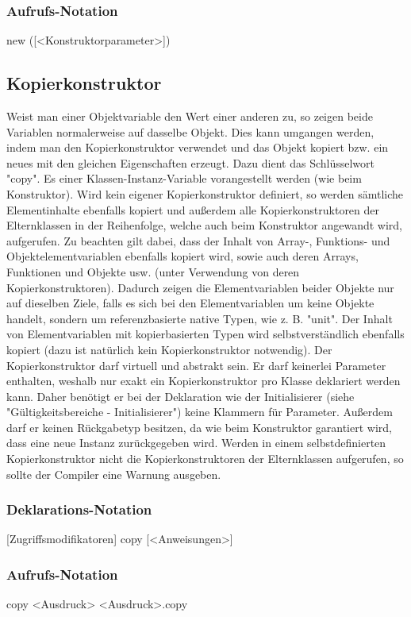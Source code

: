 \subsubsection{Aufrufs-Notation}
new ([<Konstruktorparameter>])

\subsection{Kopierkonstruktor}
Weist man einer Objektvariable den Wert einer anderen zu, so zeigen beide Variablen normalerweise auf dasselbe Objekt.
Dies kann umgangen werden, indem man den Kopierkonstruktor verwendet und das Objekt kopiert bzw. ein neues mit den gleichen
Eigenschaften erzeugt.
Dazu dient das Schlüsselwort "copy". Es einer Klassen-Instanz-Variable vorangestellt werden (wie beim Konstruktor).
Wird kein eigener Kopierkonstruktor definiert, so werden sämtliche Elementinhalte ebenfalls kopiert und außerdem
alle Kopierkonstruktoren der Elternklassen in der Reihenfolge, welche auch beim Konstruktor angewandt wird, aufgerufen.
Zu beachten gilt dabei, dass der Inhalt von Array-, Funktions- und Objektelementvariablen ebenfalls kopiert wird, sowie auch deren
Arrays, Funktionen und Objekte usw. (unter Verwendung von deren Kopierkonstruktoren). Dadurch zeigen die Elementvariablen beider Objekte nur auf
dieselben Ziele, falls es sich bei den Elementvariablen um keine Objekte handelt, sondern um referenzbasierte native Typen, wie z. B. "unit".
Der Inhalt von Elementvariablen mit kopierbasierten Typen wird selbstverständlich ebenfalls kopiert (dazu ist natürlich kein Kopierkonstruktor notwendig).
Der Kopierkonstruktor darf virtuell und abstrakt sein.
Er darf keinerlei Parameter enthalten, weshalb nur exakt ein Kopierkonstruktor pro Klasse deklariert werden kann.
Daher benötigt er bei der Deklaration wie der Initialisierer (siehe "Gültigkeitsbereiche - Initialisierer") keine Klammern für Parameter.
Außerdem darf er keinen Rückgabetyp besitzen, da wie beim Konstruktor garantiert wird, dass eine neue Instanz zurückgegeben wird.
Werden in einem selbstdefinierten Kopierkonstruktor nicht die Kopierkonstruktoren der Elternklassen aufgerufen, so sollte der Compiler eine Warnung ausgeben.

\subsubsection{Deklarations-Notation}
[Zugriffsmodifikatoren] copy { [<Anweisungen>] }

\subsubsection{Aufrufs-Notation}
copy <Ausdruck>
<Ausdruck>.copy


